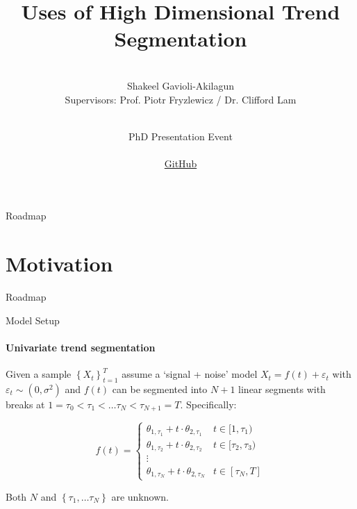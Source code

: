 \documentclass{beamer}
\title[Trend Segmentation]{Uses of High Dimensional Trend Segmentation}
\institute[LSE Department of Statistics]{}
\author[Shakeel Gavioli-Akilagun]{
\\
  {Shakeel Gavioli-Akilagun} \\
  \bigskip
  \footnotesize{Supervisors: Prof. Piotr Fryzlewicz / Dr. Clifford Lam}
}
\date[02 June 2020]{
  \hspace{1cm}\\
  PhD Presentation Event\\
  \hspace{1cm}\\
  {\fontfamily{pcr}\selectfont \href{https://github.com/Shakeel95/PhD-Presentation-1}{GitHub} }
}
\begin{document}

\begin{frame}
  \titlepage
\end{frame}




\begin{frame}{Roadmap}
  \tableofcontents
\end{frame}




\section{Motivation}




\begin{frame}{Roadmap}
\tableofcontents[currentsection]
\end{frame}






\begin{frame}{Model Setup}
\framesubtitle{Univariate trend segmentation}

Given a sample $\left \{ X_t \right \}_{t=1}^{T}$ assume a `signal + noise' model $X_t = f(t) + \varepsilon_t$ with $\varepsilon_t \sim \left ( 0, \sigma^2 \right )$ and $f(t)$ can be segmented into $N+1$ linear segments with breaks at $1 = \tau_0 < \tau_1 < \dots \tau_N < \tau_{N+1}=T$. Specifically: 

\bigskip

\begin{equation*}
f(t) = 
\left\{\begin{matrix}
        \theta_{1,\tau_1} + t \cdot \theta_{2,\tau_1} & t \in [1, \tau_1) \\ 
        \theta_{1,\tau_2} + t \cdot \theta_{2,\tau_2} & t \in [\tau_2, \tau_3)\\ 
        \vdots & \\ 
        \theta_{1,\tau_N} + t \cdot \theta_{2,\tau_N} & t \in [\tau_N,T]
\end{matrix}\right.
\end{equation*}

\bigskip

Both $N$ and $\left \{ \tau_1, \dots \tau_N \right \}$ are unknown.

\end{frame}
\end{document}
